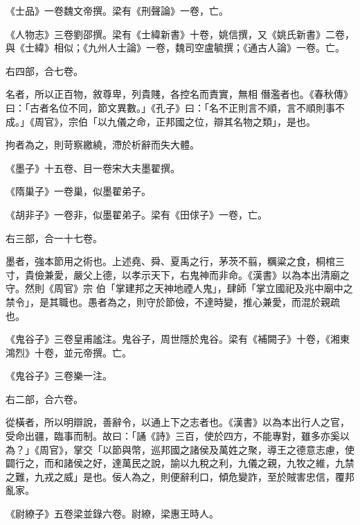 \begin{pinyinscope}
 《士品》一卷魏文帝撰。梁有《刑聲論》一卷，亡。



 《人物志》三卷劉邵撰。梁有《士緯新書》十卷，姚信撰，又《姚氏新書》二卷，與《士緯》相似；《九州人士論》一卷，魏司空盧毓撰；《通古人論》一卷。亡。



 右四部，合七卷。



 名者，所以正百物，敘尊卑，列貴賤，各控名而責實，無相
 僭濫者也。《春秋傳》曰：「古者名位不同，節文異數。」《孔子》曰：「名不正則言不順，言不順則事不成。」《周官》，宗伯「以九儀之命，正邦國之位，辯其名物之類」，是也。



 拘者為之，則苛察繳繞，滯於析辭而失大體。



 《墨子》十五卷、目一卷宋大夫墨翟撰。



 《隋巢子》一卷巢，似墨翟弟子。



 《胡非子》一卷非，似墨翟弟子。梁有《田俅子》一卷，亡。



 右三部，合一十七卷。



 墨者，強本節用之術也。上述堯、舜、夏禹之行，茅茨不翦，糲粱之食，桐棺三寸，貴儉兼愛，嚴父上德，以孝示天下，右鬼神而非命。《漢書》以為本出清廟之守。然則《周官》宗
 伯「掌建邦之天神地禋人鬼」，肆師「掌立國祀及兆中廟中之禁令」，是其職也。愚者為之，則守於節儉，不達時變，推心兼愛，而混於親疏也。



 《鬼谷子》三卷皇甫謐注。鬼谷子，周世隱於鬼谷。梁有《補闕子》十卷，《湘東鴻烈》十卷，並元帝撰。亡。



 《鬼谷子》三卷樂一注。



 右二部，合六卷。



 從橫者，所以明辯說，善辭令，以通上下之志者也。《漢書》以為本出行人之官，受命出疆，臨事而制。故曰：「誦《詩》三百，使於四方，不能專對，雖多亦奚以為？」《周官》，掌交「以節與幣，巡邦國之諸侯及萬姓之聚，導王之德意志慮，使
 闢行之，而和諸侯之好，達萬民之說，諭以九稅之利，九儀之親，九牧之維，九禁之難，九戎之威」是也。佞人為之，則便辭利口，傾危變詐，至於賊害忠信，覆邦亂家。



 《尉繚子》五卷梁並錄六卷。尉繚，梁惠王時人。




\end{pinyinscope}
